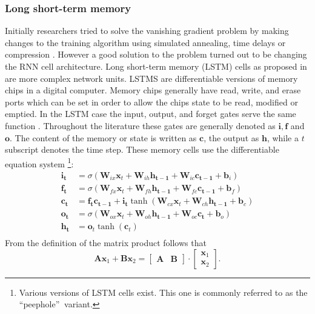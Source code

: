 \subsubsection{Long short-term memory}
Initially researchers tried to solve the vanishing gradient problem by making changes to the training algorithm using simulated annealing, time delays or compression \cite[page 32]{Graves2008}. However a good solution to the problem turned out to be changing the RNN cell architecture. Long short-term memory (LSTM) cells as proposed in \cite{Hochreiter1995} are more complex network units. LSTMS are differentiable versions of memory chips in a digital computer. Memory chips generally have read, write, and erase ports which can be set in order to allow the chips state to be read, modified or emptied. In the LSTM case the input, output, and forget gates serve the same function \cite[page 33]{Graves2008}. Throughout the literature these gates are generally denoted as $\mathbf{i}, \mathbf{f}$ and $\mathbf{o}$. The content of the memory or state is written as $\mathbf{c}$, the output as $\mathbf{h}$, while a $t$ subscript denotes the time step.
These memory cells use the differentiable equation system \cite[page 5]{Graves2013}\footnote{ Various versions of LSTM cells exist. This one is commonly referred to as the \textquotedblleft peephole\textquotedblright $ \: $ variant. }:
\begin{align}
\mathbf{i_t} &= \sigma (\mathbf{W}_{ix} \mathbf{x}_t + \mathbf{W}_{ih} \mathbf{h_{t-1}} + \mathbf{W}_{ic} \mathbf{c_{t-1}} +\mathbf{ b}_i) \\
\mathbf{f_t} &= \sigma (\mathbf{W}_{fx} \mathbf{x}_t + \mathbf{W}_{fh} \mathbf{h_{t-1}} + \mathbf{W}_{fc} \mathbf{c_{t-1}} +\mathbf{ b}_f) \\
\mathbf{c_t} &= \mathbf{f_t} \mathbf{c_{t-1}} + \mathbf{i_t} \tanh( \mathbf{W}_{cx} \mathbf{x}_t + \mathbf{W}_{ch} \mathbf{h_{t-1}} + \mathbf{b}_c ) \\
\mathbf{o_t} &= \sigma (\mathbf{W}_{ox} \mathbf{x}_t + \mathbf{W}_{oh} \mathbf{h_{t-1}} + \mathbf{W}_{oc} \mathbf{c_t} + \mathbf{b}_o ) \\
\mathbf{h_t} &= \mathbf{o}_t \tanh(\mathbf{c}_t) \\
\end{align}
From the definition of the matrix product follows that
\begin{equation}
\mathbf{A}\mathbf{x}_1 + \mathbf{B}\mathbf{x}_2
=
\begin{bmatrix} \mathbf{A} & \mathbf{B} \end{bmatrix} \cdot
\begin{bmatrix} \mathbf{x}_1 \\ \mathbf{x}_2 \end{bmatrix}.
\end{equation}
